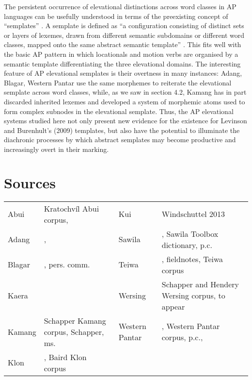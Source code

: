 The persistent occurrence of elevational distinctions across word classes in AP languages can be usefully understood in terms of the preexisting concept of ``semplates'' \citep{LevinsonEtAl2009}. A semplate is defined as ``a configuration consisting of distinct sets or layers of lexemes, drawn from different semantic subdomains or different word classes, mapped onto the same abstract semantic template''  \citep[154]{LevinsonEtAl2009}. This fits well with the basic AP pattern in which locationals and motion verbs are organised by a semantic template differentiating the three elevational domains. The interesting feature of AP elevational semplates is their overtness in many instances: Adang, Blagar, Western Pantar use the same morphemes to reiterate the elevational semplate across word classes, while, as we saw in section 4.2, Kamang has in part discarded inherited lexemes and developed a system of morphemic atoms used to form complex subnodes in the elevational semplate. Thus, the AP elevational systems studied here not only present new evidence for the existence for Levinson and Burenhult's (2009) templates, but also have the potential to illuminate the diachronic processes by which abstract semplates may become productive and increasingly overt in their marking.


\section{Sources}




\begin{tabular}{llll}

Abui & Kratochv\'il Abui corpus, \citet{Kratochvil2007} & Kui & Windschuttel 2013\\
Adang & \citet{Haan2001}, \citet{RobinsonEtAlToAppear} & Sawila & \citet{KratochvilToAppear}, Sawila Toolbox dictionary, p.c.\\
Blagar & \citet{Steinhauer1977,Steinhauer1991,Steinhauer2012}, pers. comm. & Teiwa & \citet{Klamer2010}, fieldnotes, Teiwa corpus\\
Kaera & \citet{KlamerToAppear} & Wersing & Schapper and Hendery Wersing corpus, to appear\\
Kamang & Schapper Kamang corpus, Schapper, ms. & Western Pantar & \citet{Holton2007,Holton2011,HoltonToAppear}, Western Pantar corpus, p.c., \citet{HoltonEtAl2008}\\
Klon & \citet{Baird2008}, Baird Klon corpus &  & \\
\end{tabular}



